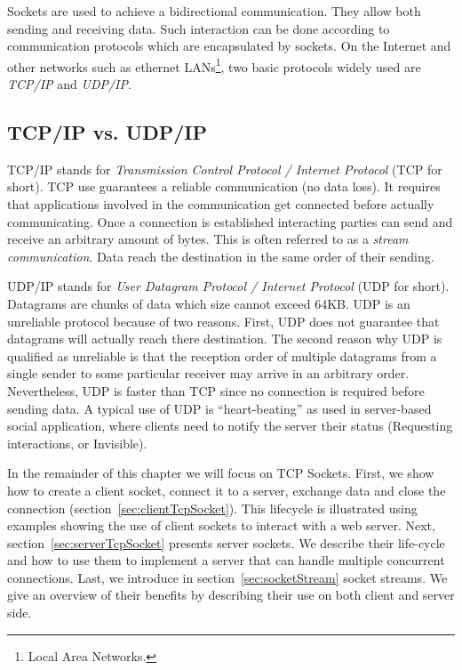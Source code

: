 \documentclass[a4paper,10pt,twoside]{book}
\begin{document}
Sockets are used to achieve a bidirectional communication. They allow both sending and receiving data. 
Such interaction can be done according to communication protocols which are encapsulated by sockets. On the Internet and other networks such as ethernet LANs\footnote{Local Area Networks.}, two basic protocols widely used are \textit{TCP/IP} and \textit{UDP/IP}.

\subsection{TCP/IP vs. UDP/IP}
TCP/IP stands for \textit{Transmission Control Protocol / Internet Protocol} (TCP for short).
TCP use guarantees a reliable communication (no data loss). It requires that applications involved in the communication get connected before actually communicating. 
Once a connection is established interacting parties can send and receive an arbitrary amount of bytes. This is often referred to as a \textit{stream communication}.
Data reach the destination in the same order of their sending.

UDP/IP stands for \textit{User Datagram Protocol / Internet Protocol} (UDP for short).
Datagrams are chunks of data which size cannot exceed 64KB.
UDP is an unreliable protocol because of two reasons.
First, UDP does not guarantee that  datagrams will actually reach there destination.
The second reason why UDP is qualified as unreliable is that the reception order of multiple datagrams from a single sender to some particular receiver may arrive in an arbitrary order.
Nevertheless, UDP is faster than TCP since no connection is required before sending data.
A typical use of UDP is  ``heart-beating'' as used in server-based social application, where clients need to notify the server their status (\eg Requesting interactions, or Invisible).

In the remainder of this chapter we will focus on TCP Sockets.
First, we show how to create a client socket, connect it to a server, exchange data and close the connection (section~\ref{sec:clientTcpSocket}).
This lifecycle is illustrated using examples showing the use of client sockets to interact with a web server. 
Next, section~\ref{sec:serverTcpSocket} presents server sockets.
We describe their life-cycle and how to use them to implement a server that can handle multiple concurrent connections.
Last, we introduce in section~\ref{sec:socketStream} socket streams.
We give an overview of their benefits by describing their use on both client and server side.
 
\end{document}
